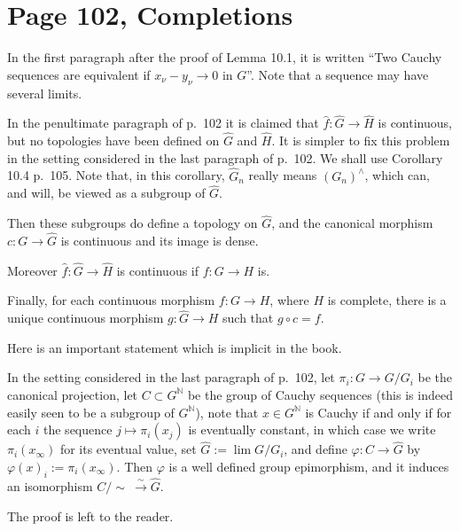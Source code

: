 \documentclass[parskip=half]{scrartcl}%
\begin{document}
\section{Page 102, Completions}%

In the first paragraph after the proof of Lemma 10.1, it is written ``Two Cauchy sequences are equivalent if $x_\nu-y_\nu\to0$ in $G$''. Note that a sequence may have several limits.%

In the penultimate paragraph of p.~102 it is claimed that $\widehat f:\widehat G\to\widehat H$ is continuous, but no topologies have been defined on $\widehat G$ and $\widehat H$. It is simpler to fix this problem in the setting considered in the last paragraph of p.~102. We shall use Corollary 10.4 p.~105. Note that, in this corollary, $\widehat G_n$ really means $(G_n)^\wedge$, which can, and will, be viewed as a subgroup of $\widehat G$. 

Then these subgroups do define a topology on $\widehat G$, and the canonical morphism $c:G\to\widehat G$ is continuous and its image is dense. 

Moreover $\widehat f:\widehat G\to\widehat H$ is continuous if $f:G\to H$ is. 

Finally, for each continuous morphism $f:G\to H$, where $H$ is complete, there is a unique continuous morphism $g:\widehat G\to H$ such that $g\circ c=f$.

Here is an important statement which is implicit in the book.

In the setting considered in the last paragraph of p.~102, let $\pi_i:G\to G/G_i$ be the canonical projection, let $C\subset G^{\mathbb N}$ be the group of Cauchy sequences (this is indeed easily seen to be a subgroup of $G^{\mathbb N}$), note that $x\in G^{\mathbb N}$ is Cauchy if and only if for each $i$ the sequence $j\mapsto\pi_i(x_j)$ is eventually constant, in which case we write $\pi_i(x_\infty)$ for its eventual value, set $\widehat G:=\lim G/G_i$, and define $\varphi:C\to\widehat G$ by $\varphi(x)_i:=\pi_i(x_\infty)$. Then $\varphi$ is a well defined group epimorphism, and it induces an isomorphism $C/\!\!\sim\ \xrightarrow\sim\widehat G$.

The proof is left to the reader.%
\end{document}
